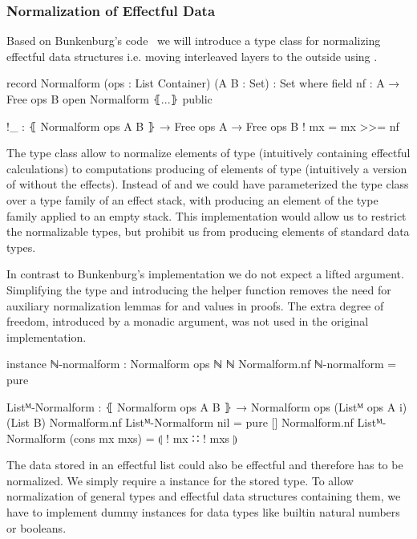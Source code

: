 \subsubsection{Normalization of Effectful Data}

Based on Bunkenburg's code~\cite{bunkenburg2019modeling} we will introduce a
type class for normalizing effectful data structures i.e. moving interleaved
 layers to the outside using \AgdaFunction{>>=}.

\begin{code}
record Normalform (ops : List Container) (A B : Set) : Set where
  field
    nf : A → Free ops B
open Normalform ⦃...⦄ public

!_ : ⦃ Normalform ops A B ⦄ → Free ops A → Free ops B
! mx = mx >>= nf
\end{code}
The type class allow to normalize elements of type  (intuitively
containing effectful calculations) to computations producing of elements of type
 (intuitively a version of  without the effects).
Instead of  and  we could have parameterized the
type class over a type family of an effect stack, with 
producing an element of the type family applied to an empty stack.
This implementation would allow us to restrict the normalizable types, but
prohibit us from producing elements of standard data types.

In contrast to Bunkenburg's implementation we do not expect a lifted argument.
Simplifying the type and introducing the helper function \AgdaFunction{!\_}
removes the need for auxiliary normalization lemmas for
 and  values in
proofs.
The extra degree of freedom, introduced by a monadic argument, was not used in
the original implementation.

\begin{code}
instance
  ℕ-normalform : Normalform ops ℕ ℕ
  Normalform.nf ℕ-normalform = pure

  Listᴹ-Normalform : ⦃ Normalform ops A B ⦄ →
    Normalform ops (Listᴹ ops A {i}) (List B)
  Normalform.nf Listᴹ-Normalform nil            = pure []
  Normalform.nf Listᴹ-Normalform (cons mx mxs)  = ⦇ ! mx ∷ ! mxs ⦈
\end{code}
The data stored in an effectful list could also be effectful and therefore has
to be normalized.
We simply require a  instance for the stored type.
To allow normalization of general types and effectful data structures containing
them, we have to implement dummy instances for data types like builtin natural
numbers or booleans.

